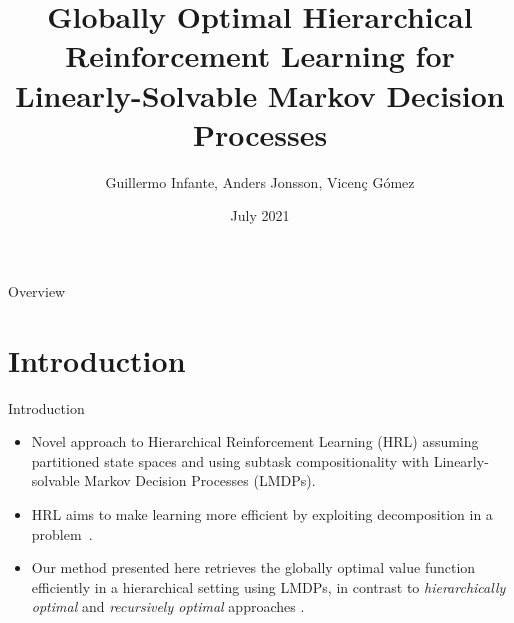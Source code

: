 \documentclass{beamer}
\title[Globally Optimal HRL for LMDPs]{Globally Optimal Hierarchical Reinforcement Learning for Linearly-Solvable Markov Decision Processes}
\author[G. Infante, A. Jonsson, V. Gómez ]{Guillermo Infante, Anders Jonsson, Vicenç Gómez }
\date[July 2021]{July 2021}
\theoremstyle{mystyle}
\begin{document}
\begin{frame}
   \maketitle
\end{frame}

\begin{frame}{Overview}
\tableofcontents
\end{frame}

\section{Introduction}

\begin{frame}{Introduction}

\begin{itemize}
    \item Novel approach to Hierarchical Reinforcement Learning (HRL) assuming partitioned state spaces 
    and using subtask compositionality with Linearly-solvable Markov Decision Processes (LMDPs).
    \item HRL aims to make learning more efficient by exploiting decomposition in a problem~\cite{conf/nips/Wen20}.
    \item Our method presented here retrieves the globally optimal value function efficiently in a hierarchical setting using LMDPs, in contrast to \textit{hierarchically optimal} and \textit{recursively optimal} approaches \cite{dietterich2000hierarchical}.
\end{itemize}
    
\end{frame}
\end{document}
